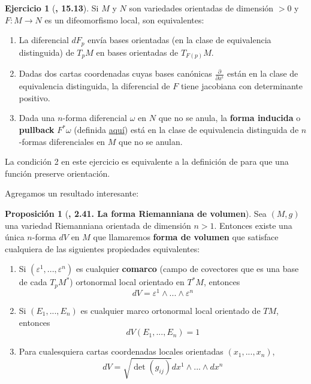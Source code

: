 \documentclass[spanish]{book}
\theoremstyle{definition}
\newtheorem*{prop}{Proposición}
\newtheorem*{ejer*}{Ejercicio}
\begin{document}
	\begin{ejer*}[\cite{Lee}\textbf{, 15.13}]
		Si $M$ y $N$ son variedades orientadas de dimensión $>0$ y ${F:M\to N}$ es un difeomorfismo local, son equivalentes:
		\begin{enumerate}
			\item La diferencial $dF_p$ envía bases orientadas (en la clase de equivalencia distinguida) de $T_pM$ en bases orientadas de $T_{F(p)}M$.
			\item Dadas dos cartas coordenadas cuyas bases canónicas $\frac{\partial}{\partial x^i}$ están en la clase de equivalencia distinguida, la diferencial de $F$ tiene jacobiana con determinante positivo.
			\item Dada una $n$-forma diferencial $\omega$ en $N$ que no se anula, la \textbf{forma inducida} o \textbf{pullback} $F^*\omega$ (definida \hyperref[pullback]{aquí}) está en la clase de equivalencia distinguida de $n$-formas diferenciales en $M$ que no se anulan.
		\end{enumerate}
	\end{ejer*}
	
	La condición 2 en este ejercicio es equivalente a la definición de \cite{DoCarmo} para que una función preserve orientación.
	
	Agregamos un resultado interesante:
	\begin{prop}[\cite{Lee-riem}\textbf{, 2.41. La forma Riemanniana de volumen}]
		
		Sea $(M,g)$ una variedad Riemanniana orientada de dimensión $n>1$. Entonces existe una única $n$-forma $dV$ en $M$ que llamaremos \textbf{forma de volumen} que satisface cualquiera de las siguientes propiedades equivalentes:
		
		\begin{enumerate}[label={(\arabic*)}]
			\item Si $(\varepsilon^1,...,\varepsilon^n)$ es cualquier \textbf{comarco} (campo de covectores que es una base de cada $T_pM^*$) ortonormal local orientado en $T^*M$, entonces
			\[dV=\varepsilon^1\wedge...\wedge\varepsilon^n\]
			\item Si $(E_1,...,E_n)$ es cualquier marco ortonormal local orientado de $TM$, entonces
			\[dV(E_1,...,E_n)=1\]
			\item Para cualesquiera cartas coordenadas locales orientadas $(x_1,...,x_n)$,
			$$dV=\sqrt{\det (g_{ij})}dx^1\wedge...\wedge dx^n$$
		\end{enumerate}
	\end{prop}
	
\end{document}
